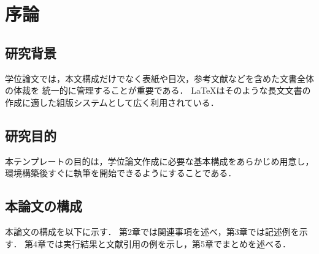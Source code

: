 
\chapter{序論}

\section{研究背景}

学位論文では，本文構成だけでなく表紙や目次，参考文献などを含めた文書全体の体裁を
統一的に管理することが重要である．
\LaTeX{}はそのような長文文書の作成に適した組版システムとして広く利用されている．

\section{研究目的}

本テンプレートの目的は，学位論文作成に必要な基本構成をあらかじめ用意し，
環境構築後すぐに執筆を開始できるようにすることである．

\section{本論文の構成}

本論文の構成を以下に示す．
第2章では関連事項を述べ，第3章では記述例を示す．
第4章では実行結果と文献引用の例を示し，第5章でまとめを述べる．
